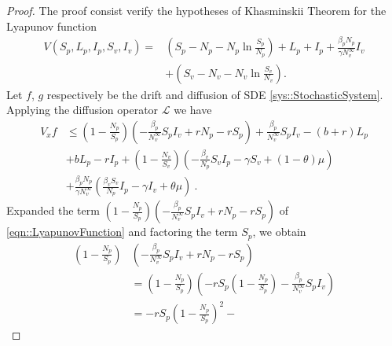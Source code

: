 \begin{proof}
	The proof consist verify the hypotheses of Khasminskii Theorem 
	\cite{Agarwal2019} for 
	the Lyapunov function
	\begin{align*}
		V(S_p, L_p, I_p, S_v, I_v) 
			=& 
				\left(
					S_p - N_p - N_p 
					\ln 
					\frac{S_p}{N_p}
				\right) + 
				L_p + I_p + 
				\frac{\beta_p N_p}{\gamma N^\infty_v} I_v
			\\
			&+
				\left(
					S_v - N_v - N_v 
					\ln
					\frac{S_v}{N_v}
				\right).
	\end{align*}
	Let $f$, $g$ respectively be the drift and diffusion of SDE 
	\autoref{sys::StochasticSystem}. Applying the diffusion operator
	$\mathcal{L}$ we have
	\begin{equation}\label{eqn::LyapunovFunction}
		\begin{aligned}
			V_x f 
				&\leq
					\left(
						1 - 
						\frac{N_p}{S_p}
					\right)
					\left(
						-
						\frac{\beta_p}{N^\infty_v} S_p I_v + 
						r N_p - r S_p
					\right) + 
					\frac{\beta_p}{N^\infty_v} S_p I_v - 
					(b + r) L_p
				\\
				&+
					b L_p - r I_p + 
					\left(
						1 - 
						\frac{N_v}{S_v}
					\right)
					\left( 
						-\frac{\beta_v}{N_p} S_v I_p - 
						\gamma S_v + 
						(1 - \theta) \mu 
					\right)
				\\
				&+
					\frac{\beta_p N_p}{\gamma N ^ \infty_v}
					\left(
						\frac{\beta_v S_v}{N_p}
						I_p - \gamma I_v + 
						\theta \mu
					\right)  \ .
		\end{aligned}
	\end{equation}
	Expanded the term $\left(
				1 - \frac{N_p}{S_p}
			\right)
			\left(
				-\frac{\beta_p}{N^\infty_v} S_p I_v +
				r N_p - r S_p
			\right)$ 
			of \autoref{eqn::LyapunovFunction} and factoring the term $S_p$,
			we obtain
	\begin{equation}
		\label{theorem2term1}
		\begin{aligned}
			\left(
				1 - \frac{N_p}{S_p}
			\right)
			&
			\left(
				-\frac{\beta_p}{N^\infty_v} S_p I_v +
				r N_p - r S_p
			\right) 	
			\\
			&=
				\left(
						1 - \frac{N_p}{S_p}
					\right)
					\left(- r S_p 
						\left(
							1 - \frac{N_p}{S_p}
						\right) - 
						\frac{\beta_p}{N^\infty_v} S_p I_v
					\right)
			\\
			&=
				- r S_p 
				\left(
					1 - 
					\frac{N_p}{S_p}
				\right) ^ 2 - 

\end{aligned}
\end{equation}
\end{proof}

